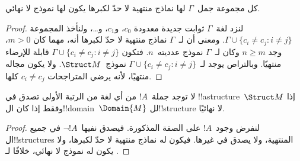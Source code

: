 \documentclass[../../../include/open-logic-section]{subfiles}
\begin{document}

\begin{thm}
 كل مجموعة جمل~$\Gamma$ لها نماذج منتهية لا حدّ لكبرها
يكون لها نموذج لا نهائي.
\end{thm}

\begin{proof}
لنزد لغة~$\Gamma$ ثوابت جديدة معدودة $c_0$، و$c_1$،
و\dots، ولنأخذ المجموعة $\Gamma \cup \{c_i \neq c_j : i \neq
  j\}$. ومعنى أن لـ~$\Gamma$ نماذج منتهية لا حدّ لكبرها أنه،
مهما كان $m >0$، وجد $n\ge m$ وكان لـ~$\Gamma$ نموذج عدديته~$n$.
فتكون $\Gamma \cup \{c_i \neq c_j : i \neq j\}$ قابلة للإرضاء
منتهيًا. وبالتراص يوجد لـ~$\Gamma \cup \{c_i \neq c_j : i
\neq j\}$ نموذج~$\Struct M$. ولا يكون مجاله منتهيًا، لأنه يرضي
المتراجحات $c_i \neq c_j$ كلها.
\end{proof}

\begin{prop}
لا توجد جملة~$!A$ من أي لغة من الرتبة الأولى تصدق في
!!a{structure}~$\Struct M$ إذا وفقط إذا كان ال!!{domain}~$\Domain{M}$
لل!!{structure} لا نهائيًا.
\end{prop}

\begin{proof}
لنفرض وجود~$!A$ على الصفة المذكورة. فيصدق نفيها~$\lnot !A$
في جميع ال!!{structure}s المنتهية، ولا يصدق في غيرها. فيكون
  له نماذج منتهية لا حدّ لكبرها، ولا يكون له نموذج لا نهائي،
خلافًا لـ .
\end{proof}
\end{document}
